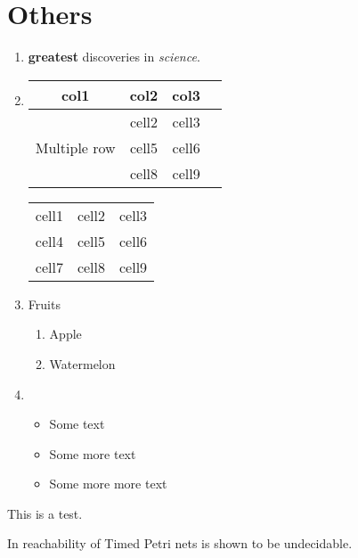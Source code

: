 \documentclass{article}
\begin{document}
\section{Others}
\begin{enumerate}[label=(\alph*)]
	\item \textbf{greatest} discoveries in \textit{science}.
	\item
		\begin{tabular}{ |c|c|c|c| } 
		\hline
		col1 & col2 & col3 \\
		\hline
		\multirow{3}{4em}{Multiple row} & cell2 & cell3 \\ 
		& cell5 & cell6 \\ 
		& cell8 & cell9 \\ 
		\hline
		\end{tabular}

		\begin{tabular}{ |c|c|c| } 
		 \hline
		 cell1 & cell2 & cell3 \\ 
		 cell4 & cell5 & cell6 \\ 
		 cell7 & cell8 & cell9 \\ 
		 \hline
		\end{tabular}

	\item Fruits
		\begin{enumerate}[label=(\roman*)]
			\item Apple
			\item Watermelon
		\end{enumerate}

	\item
		\begin{itemize}
		   \item Some text
		   \item Some more text
		   \item Some more more text
		\end{itemize}



\end{enumerate}



		This is a test.

		In \cite{Jones77} reachability of Timed Petri nets is shown to be
undecidable. 
\end{document}
